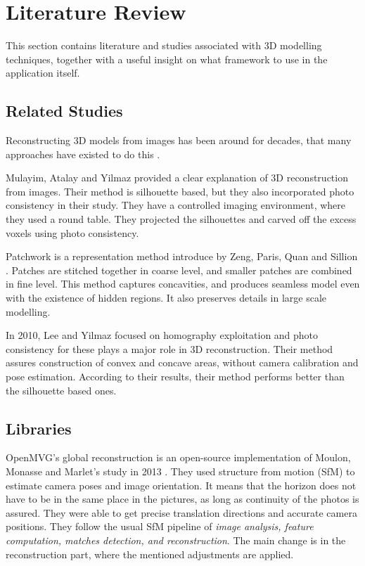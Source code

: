 \documentclass[journal]{./IEEE/IEEEtran}
\begin{document}
\section{Literature Review}
This section contains literature and studies associated with 3D modelling techniques, together with a useful insight on what framework to use in the application itself.

\subsection{Related Studies}
Reconstructing 3D models from images has been around for decades, that many approaches have existed to do this \cite{Paris}.

Mulayim, Atalay and Yilmaz \cite{MulayimAtalayYilmaz} provided a clear explanation of 3D reconstruction from images. Their method is silhouette based, but they also incorporated photo consistency in their study. They have a controlled imaging environment, where they used a round table. They projected the silhouettes and carved off the excess voxels using photo consistency. 

Patchwork is a representation method introduce by Zeng, Paris, Quan and Sillion \cite{ZengParisQuanSillion}. Patches are stitched together in coarse level, and smaller patches are combined in fine level. This method captures concavities, and produces seamless model even with the existence of hidden regions. It also preserves details in large scale modelling.
\pubidadjcol

In 2010, Lee and Yilmaz \cite{LeeYilmaz} focused on homography exploitation and photo consistency for these plays a major role in 3D reconstruction. Their method assures construction of convex and concave areas, without camera calibration and pose estimation. According to their results, their method performs better than the silhouette based ones.

\subsection{Libraries}
OpenMVG's global reconstruction is an open-source implementation of  Moulon, Monasse and Marlet's study in 2013 \cite{MoulonMonasseMarlet}. They used structure from motion (SfM) to estimate camera poses and image orientation. It means that the horizon does not have to be in the same place in the pictures, as long as continuity of the photos is assured. They were able to get precise translation directions and accurate camera positions. They follow the usual SfM pipeline of \textit{image analysis, feature computation, matches detection, and reconstruction}. The main change is in the reconstruction part, where the mentioned adjustments are applied.
\end{document}
